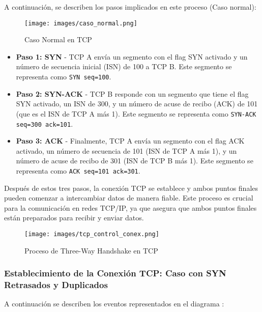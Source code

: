 \documentclass[a4paper,12pt]{article}
\begin{document}
A continuación, se describen los pasos implicados en este proceso (Caso normal):

\begin{figure}[H]
    \centering
    \texttt{[image: images/caso\_normal.png]}
    \caption{Caso Normal en TCP}
    \label{fig:three_way_handshake}
\end{figure}

\begin{itemize}
    \item \textbf{Paso 1: SYN} - TCP A envía un segmento con el flag SYN activado y un número de secuencia inicial (ISN) de 100 a TCP B. Este segmento se representa como \texttt{SYN seq=100}.
    \item \textbf{Paso 2: SYN-ACK} - TCP B responde con un segmento que tiene el flag SYN activado, un ISN de 300, y un número de acuse de recibo (ACK) de 101 (que es el ISN de TCP A más 1). Este segmento se representa como \texttt{SYN-ACK seq=300 ack=101}.
    \item \textbf{Paso 3: ACK} - Finalmente, TCP A envía un segmento con el flag ACK activado, un número de secuencia de 101 (ISN de TCP A más 1), y un número de acuse de recibo de 301 (ISN de TCP B más 1). Este segmento se representa como \texttt{ACK seq=101 ack=301}.
\end{itemize}

Después de estos tres pasos, la conexión TCP se establece y ambos puntos finales pueden comenzar a intercambiar datos de manera fiable. Este proceso es crucial para la comunicación en redes TCP/IP, ya que asegura que ambos puntos finales están preparados para recibir y enviar datos.

\begin{figure}[H]
    \centering
    \texttt{[image: images/tcp\_control\_conex.png]}
    \caption{Proceso de Three-Way Handshake en TCP}
    \label{fig:three_way_handshake}
\end{figure}

\subsubsection{Establecimiento de la Conexión TCP: Caso con SYN Retrasados y Duplicados}

A continuación se describen los eventos representados en el diagrama :
\end{document}
